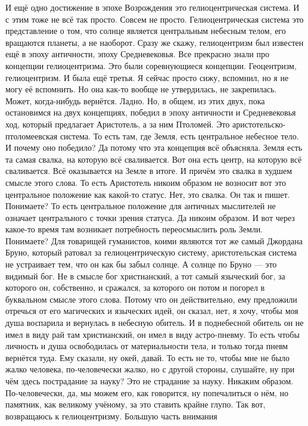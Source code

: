И ещё одно достижение в
эпохе Возрождения это гелиоцентрическая система. И с этим тоже не всё так
просто. Совсем не просто. Гелиоцентрическая система это представление о том, что
солнце является центральным небесным телом, его вращаются планеты, а не
наоборот. Сразу же скажу, гелиоцентризм был известен ещё в эпоху античности,
эпоху Средневековья. Все прекрасно знали про концепции гелиоцентризма. Это были
соревнующиеся концепции. Геоцентризм, гелиоцентризм. И была ещё третья. Я сейчас
просто сижу, вспомнил, но я не могу её вспомнить. Но она как-то вообще не
утвердилась, не закрепилась. Может, когда-нибудь вернётся. Ладно. Но, в общем,
из этих двух, пока остановимся на двух концепциях, победил в эпоху античности и
Средневековья ход, который предлагает Аристотель, а за ним Птоломей. Это
аристотельско-птоломеевская система. То есть там, где Земля, есть центральное
небесное тело. И почему оно победило? Да потому что эта концепция всё объясняла.
Земля есть та самая свалка, на которую всё сваливается. Вот она есть центр, на
которую всё сваливается. Всё оказывается на Земле в итоге. И причём это свалка в
худшем смысле этого слова. То есть Аристотель никоим образом не возносит вот это
центральное положение как какой-то статус. Нет, это свалка. Он так и пишет.
Понимаете? То есть центральное положение для античных мыслителей не означает
центрального с точки зрения статуса. Да никоим образом. И вот через какое-то
время там возникает потребность переосмыслить роль Земли. Понимаете? Для
товарищей гуманистов, коими являются тот же самый Джордана Бруно, который
ратовал за гелиоцентрическую систему, аристотельская система не устраивает тем,
что он как бы забыл солнце. А солнце по Бруно — это видимый бог. Не в смысле бог
христианский, а тот самый языческий бог, за которого он, собственно, и сражался,
за которого он потом и погорел в буквальном смысле этого слова. Потому что он
действительно, ему предложили отречься от его магических и языческих идей, он
сказал, нет, я хочу, чтобы моя душа воспарила и вернулась в небесную обитель. И
в поднебесной обитель он не имел в виду рай там христианский, он имел в виду
астро-пневму. То есть чтобы личность и душа освободилась от материальности тела,
и только тогда пневм вернётся туда. Ему сказали, ну окей, давай. То есть не то,
чтобы мне не было жалко человека, по-человечески жалко, но с другой стороны,
слушайте, ну при чём здесь пострадание за науку? Это не страдание за науку.
Никаким образом. По-человечески, да, мы можем его, как говорится, ну
попечалиться о нём, но памятник, как великому учёному, за это ставить крайне
глупо. Так вот, возвращаюсь к гелиоцентризму. Большую часть внимания
